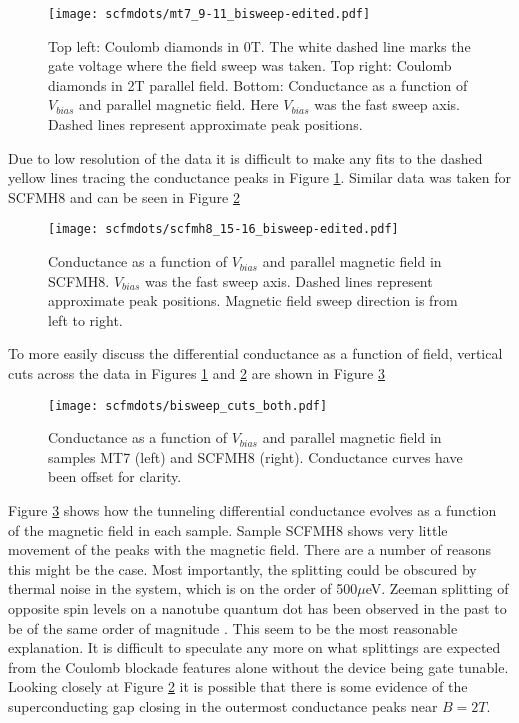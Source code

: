 \begin{figure}
    \centering
    \texttt{[image: scfmdots/mt7\_9-11\_bisweep-edited.pdf]}
    \caption{Top left: Coulomb diamonds in 0T. The white dashed line marks the gate voltage where the field sweep was taken. Top right: Coulomb diamonds in 2T parallel field. Bottom: Conductance as a function of $V_{bias}$ and parallel magnetic field. Here $V_{bias}$ was the fast sweep axis. Dashed lines represent approximate peak positions.}
    \label{fig:mt7_bisweep_edit}
\end{figure}

Due to low resolution of the data it is difficult to make any fits to the dashed yellow lines tracing the conductance peaks in Figure \ref{fig:mt7_bisweep_edit}. Similar data was taken for SCFMH8 and can be seen in Figure \ref{fig:scfmh8_bisweep_edit}

\begin{figure}
    \centering
    \texttt{[image: scfmdots/scfmh8\_15-16\_bisweep-edited.pdf]}
    \caption{Conductance as a function of $V_{bias}$ and parallel magnetic field in SCFMH8. $V_{bias}$ was the fast sweep axis. Dashed lines represent approximate peak positions. Magnetic field sweep direction is from left to right.}
    \label{fig:scfmh8_bisweep_edit}
\end{figure}

To more easily discuss the differential conductance as a function of field, vertical cuts across the data in Figures \ref{fig:mt7_bisweep_edit} and \ref{fig:scfmh8_bisweep_edit} are shown in Figure \ref{fig:bisweep_cuts_all}

\begin{figure}
    \centering
    \texttt{[image: scfmdots/bisweep\_cuts\_both.pdf]}
    \caption{Conductance as a function of $V_{bias}$ and parallel magnetic field in samples MT7 (left) and SCFMH8 (right). Conductance curves have been offset for clarity.}
    \label{fig:bisweep_cuts_all}
\end{figure}

Figure \ref{fig:bisweep_cuts_all} shows how the tunneling differential conductance evolves as a function of the magnetic field in each sample. Sample SCFMH8 shows very little movement of the peaks with the magnetic field. There are a number of reasons this might be the case. Most importantly, the splitting could be obscured by thermal noise in the system, which is on the order of 500$\mu$eV. Zeeman splitting of opposite spin levels on a nanotube quantum dot has been observed in the past to be of the same order of magnitude \cite{Tans1997}. This seem to be the most reasonable explanation. It is difficult to speculate any more on what splittings are expected from the Coulomb blockade features alone without the device being gate tunable. Looking closely at Figure \ref{fig:scfmh8_bisweep_edit} it is possible that there is some evidence of the superconducting gap closing in the outermost conductance peaks near $B=2T$.

